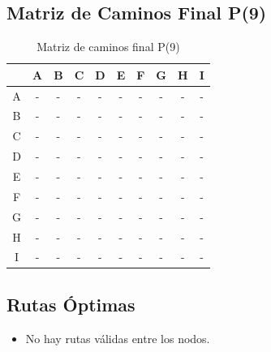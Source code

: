 \documentclass[12pt]{article}
\begin{document}
\subsection{Matriz de Caminos Final P(9)}
\begin{table}[h!]
\centering
\begin{tabular}{|c|c|c|c|c|c|c|c|c|c|}
\hline
 & A & B & C & D & E & F & G & H & I \\\hline
A & - & - & - & - & - & - & - & - & - \\\hline
B & - & - & - & - & - & - & - & - & - \\\hline
C & - & - & - & - & - & - & - & - & - \\\hline
D & - & - & - & - & - & - & - & - & - \\\hline
E & - & - & - & - & - & - & - & - & - \\\hline
F & - & - & - & - & - & - & - & - & - \\\hline
G & - & - & - & - & - & - & - & - & - \\\hline
H & - & - & - & - & - & - & - & - & - \\\hline
I & - & - & - & - & - & - & - & - & - \\\hline
\end{tabular}
\caption{Matriz de caminos final P(9)}
\end{table}

\clearpage
\subsection{Rutas Óptimas}
\begin{itemize}
\item No hay rutas válidas entre los nodos.
\end{itemize}
\end{document}

